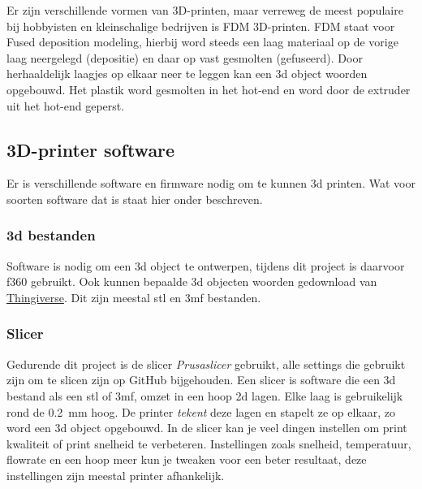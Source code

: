 Er zijn verschillende vormen van 3D-printen, maar verreweg de meest populaire
bij hobbyisten en kleinschalige bedrijven is FDM 3D-printen. FDM staat voor
Fused deposition modeling, hierbij word steeds een laag materiaal op de vorige
laag neergelegd (depositie) en daar op vast gesmolten (gefuseerd). Door
herhaaldelijk laagjes op elkaar neer te leggen kan een \ac{3d} object woorden
opgebouwd. Het plastik word gesmolten in het hot-end en word door de extruder
uit het hot-end geperst.

\subsection{3D-printer software}

Er is verschillende software en firmware nodig om te kunnen 3d printen. Wat
voor soorten software dat is staat hier onder beschreven.

\subsubsection{\ac{3d} bestanden}

Software is nodig om een 3d object te ontwerpen, tijdens dit project is
daarvoor \ac{f360} gebruikt. Ook kunnen bepaalde \ac{3d} objecten woorden
gedownload van \href{https://www.thingiverse.com}{Thingiverse}. Dit zijn
meestal \ac{stl} en \ac{3mf} bestanden.

\subsubsection{Slicer}

Gedurende dit project is de slicer \emph{Prusaslicer} gebruikt, alle settings
die gebruikt zijn om te slicen zijn op GitHub bijgehouden.  Een slicer is
software die een \ac{3d} bestand als een \ac{stl} of \ac{3mf}, omzet in een
hoop \ac{2d} lagen. Elke laag is gebruikelijk rond de \SI{0.2}{\milli\meter}
hoog. De printer \emph{tekent} deze lagen en stapelt ze op elkaar, zo word een
\ac{3d} object opgebouwd. In de slicer kan je veel dingen instellen om print
kwaliteit of print snelheid te verbeteren. Instellingen zoals snelheid,
temperatuur, flowrate en een hoop meer kun je tweaken voor een beter resultaat,
deze instellingen zijn meestal printer afhankelijk.

